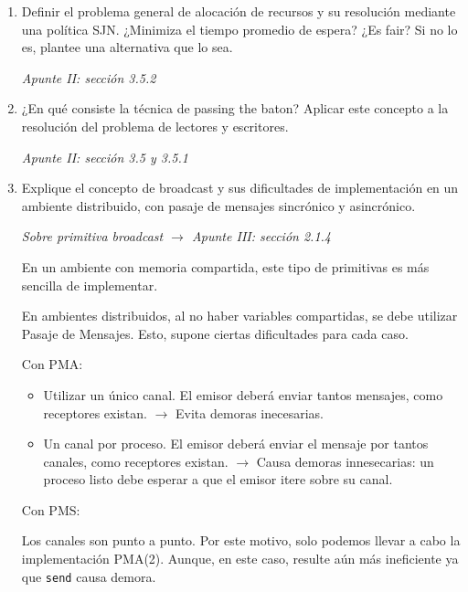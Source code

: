 \documentclass[a4paper, 10pt]{article}
\newenvironment{QandA}{
    \begin{enumerate}\bfseries}
    {\end{enumerate}
}
\newenvironment{answered}{\par\normalfont}{}
\begin{document}
\begin{QandA}

\item Definir el problema general de alocación de recursos y su resolución mediante una política SJN. ¿Minimiza el tiempo promedio de espera? ¿Es fair? Si no lo es, plantee una alternativa que lo sea.
\begin{answered}
    \emph{Apunte II: sección 3.5.2}
\end{answered}


\item ¿En qué consiste la técnica de passing the baton? Aplicar este concepto a la resolución del problema de lectores y escritores.
\begin{answered}
    \emph{Apunte II: sección 3.5 y 3.5.1}
\end{answered}


\item Explique el concepto de broadcast y sus dificultades de implementación en un ambiente distribuido, con pasaje de mensajes sincrónico y asincrónico.
\begin{answered}
\emph{Sobre primitiva broadcast $\rightarrow$ Apunte III: sección 2.1.4}

En un ambiente con memoria compartida, este tipo de primitivas es más sencilla de implementar. 

En ambientes distribuidos, al no haber variables compartidas, se debe utilizar Pasaje de Mensajes. Esto, supone ciertas dificultades para cada caso.

Con PMA:
\begin{itemize}
    \item Utilizar un único canal. El emisor deberá enviar tantos mensajes, como receptores existan. $\rightarrow$ Evita demoras inecesarias.
    \item Un canal por proceso. El emisor deberá enviar el mensaje por tantos canales, como receptores existan. $\rightarrow$ Causa demoras innesecarias: un proceso listo debe esperar a que el emisor itere sobre su canal. 
\end{itemize}

Con PMS:

Los canales son punto a punto. Por este motivo, solo podemos llevar a cabo la implementación PMA(2). Aunque, en este caso, resulte aún más ineficiente ya que \lstinline{send} causa demora.
\end{answered}


\end{QandA}
\end{document}
